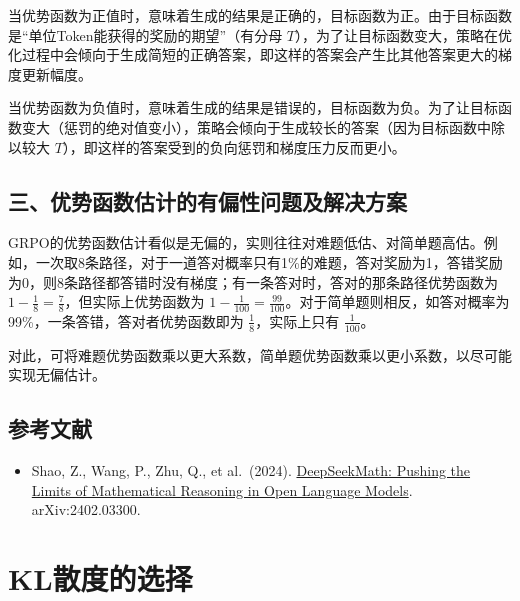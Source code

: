 当优势函数为正值时，意味着生成的结果是正确的，目标函数为正。由于目标函数是``单位Token能获得的奖励的期望''（有分母 \(T\)），为了让目标函数变大，策略在优化过程中会倾向于生成简短的正确答案，即这样的答案会产生比其他答案更大的梯度更新幅度。

当优势函数为负值时，意味着生成的结果是错误的，目标函数为负。为了让目标函数变大（惩罚的绝对值变小），策略会倾向于生成较长的答案（因为目标函数中除以较大 \(T\)），即这样的答案受到的负向惩罚和梯度压力反而更小。

\hypertarget{ux4e09ux4f18ux52bfux51fdux6570ux4f30ux8ba1ux7684ux6709ux504fux6027ux95eeux9898ux53caux89e3ux51b3ux65b9ux6848}{%
\subsection{三、优势函数估计的有偏性问题及解决方案}\label{ux4e09ux4f18ux52bfux51fdux6570ux4f30ux8ba1ux7684ux6709ux504fux6027ux95eeux9898ux53caux89e3ux51b3ux65b9ux6848}}

GRPO的优势函数估计看似是无偏的，实则往往对难题低估、对简单题高估。例如，一次取8条路径，对于一道答对概率只有1\%的难题，答对奖励为1，答错奖励为0，则8条路径都答错时没有梯度；有一条答对时，答对的那条路径优势函数为 \(1-\frac{1}{8}=\frac{7}{8}\)，但实际上优势函数为 \(1-\frac{1}{100}=\frac{99}{100}\)。对于简单题则相反，如答对概率为99\%，一条答错，答对者优势函数即为 \(\frac{1}{8}\)，实际上只有 \(\frac{1}{100}\)。

对此，可将难题优势函数乘以更大系数，简单题优势函数乘以更小系数，以尽可能实现无偏估计。

\hypertarget{ux53c2ux8003ux6587ux732e-83}{%
\subsection{参考文献}\label{ux53c2ux8003ux6587ux732e-83}}

\begin{itemize}
\tightlist
\item
  Shao, Z., Wang, P., Zhu, Q., et al.~(2024). \href{https://arxiv.org/abs/2402.03300}{DeepSeekMath: Pushing the Limits of Mathematical Reasoning in Open Language Models}. arXiv:2402.03300.
\end{itemize}

\clearpage

\hypertarget{klux6563ux5ea6ux7684ux9009ux62e9}{%
\section{KL散度的选择}\label{klux6563ux5ea6ux7684ux9009ux62e9}}

